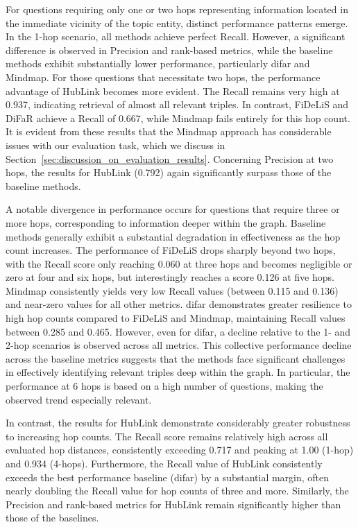 For questions requiring only one or two hops representing information located in the immediate vicinity of the topic entity, distinct performance patterns emerge. In the 1-hop scenario, all methods achieve perfect Recall. However, a significant difference is observed in Precision and rank-based metrics, while the baseline methods exhibit substantially lower performance, particularly \gls{difar} and Mindmap. For those questions that necessitate two hops, the performance advantage of HubLink becomes more evident. The Recall remains very high at 0.937, indicating retrieval of almost all relevant triples. In contrast, FiDeLiS and DiFaR achieve a Recall of 0.667, while Mindmap fails entirely for this hop count. It is evident from these results that the Mindmap approach has considerable issues with our evaluation task, which we discuss in Section~\ref{sec:discussion_on_evaluation_results}. Concerning Precision at two hops, the results for HubLink (0.792) again significantly surpass those of the baseline methods.

A notable divergence in performance occurs for questions that require three or more hops, corresponding to information deeper within the graph. Baseline methods generally exhibit a substantial degradation in effectiveness as the hop count increases. The performance of FiDeLiS drops sharply beyond two hops, with the Recall score only reaching 0.060 at three hops and becomes negligible or zero at four and six hops, but interestingly reaches a score 0.126 at five hops. Mindmap consistently yields very low Recall values (between 0.115 and 0.136) and near-zero values for all other metrics. \gls{difar} demonstrates greater resilience to high hop counts compared to FiDeLiS and Mindmap, maintaining Recall values between 0.285 and 0.465. However, even for \gls{difar}, a decline relative to the 1- and 2-hop scenarios is observed across all metrics. This collective performance decline across the baseline metrics suggests that the methods face significant challenges in effectively identifying relevant triples deep within the graph. In particular, the performance at 6 hops is based on a high number of questions, making the observed trend especially relevant.

In contrast, the results for HubLink demonstrate considerably greater robustness to increasing hop counts. The Recall score remains relatively high across all evaluated hop distances, consistently exceeding 0.717 and peaking at 1.00 (1-hop) and 0.934 (4-hops). Furthermore, the Recall value of HubLink consistently exceeds the best performance baseline (\gls{difar}) by a substantial margin, often nearly doubling the Recall value for hop counts of three and more. Similarly, the Precision and rank-based metrics for HubLink remain significantly higher than those of the baselines.

